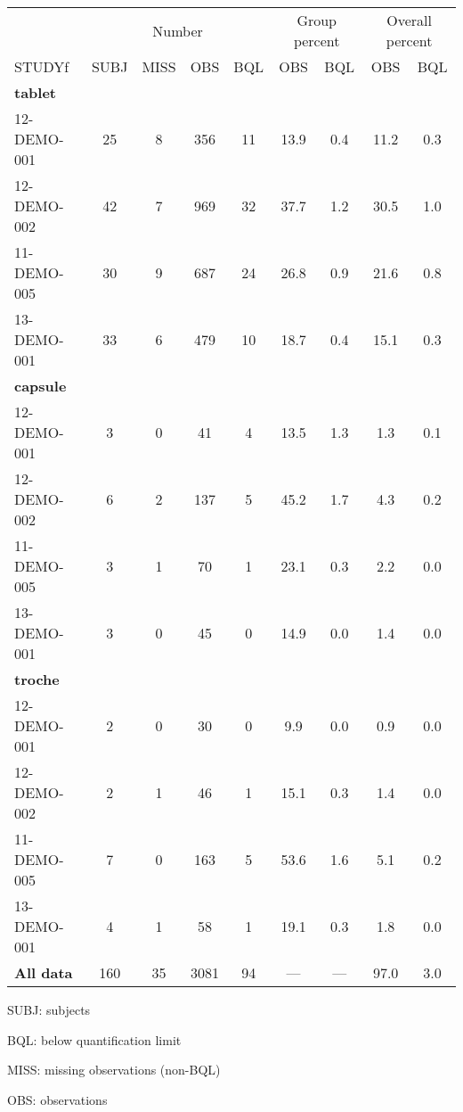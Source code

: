\setlength{\tabcolsep}{5pt} 
\begin{threeparttable}
\renewcommand{\arraystretch}{1.3}
\begin{tabular}[h]{lcccccccc}
\hline
\multicolumn{1}{c}{} & \multicolumn{4}{c}{Number} & \multicolumn{2}{c}{Group percent} & \multicolumn{2}{c}{Overall percent} \\
\cmidrule(lr){2-5}
\cmidrule(lr){6-7}
\cmidrule(lr){8-9}
STUDYf & SUBJ & MISS & OBS & BQL & OBS & BQL & OBS & BQL \\
\hline
\multicolumn{9}{l}{\textbf{tablet}}\\%
12-DEMO-001 & 25 & 8 & 356 & 11 & 13.9 & 0.4 & 11.2 & 0.3 \\
12-DEMO-002 & 42 & 7 & 969 & 32 & 37.7 & 1.2 & 30.5 & 1.0 \\
11-DEMO-005 & 30 & 9 & 687 & 24 & 26.8 & 0.9 & 21.6 & 0.8 \\
13-DEMO-001 & 33 & 6 & 479 & 10 & 18.7 & 0.4 & 15.1 & 0.3 \\
\hline \multicolumn{9}{l}{\textbf{capsule}}\\%
12-DEMO-001 & 3 & 0 & 41 & 4 & 13.5 & 1.3 & 1.3 & 0.1 \\
12-DEMO-002 & 6 & 2 & 137 & 5 & 45.2 & 1.7 & 4.3 & 0.2 \\
11-DEMO-005 & 3 & 1 & 70 & 1 & 23.1 & 0.3 & 2.2 & 0.0 \\
13-DEMO-001 & 3 & 0 & 45 & 0 & 14.9 & 0.0 & 1.4 & 0.0 \\
\hline \multicolumn{9}{l}{\textbf{troche}}\\%
12-DEMO-001 & 2 & 0 & 30 & 0 & 9.9 & 0.0 & 0.9 & 0.0 \\
12-DEMO-002 & 2 & 1 & 46 & 1 & 15.1 & 0.3 & 1.4 & 0.0 \\
11-DEMO-005 & 7 & 0 & 163 & 5 & 53.6 & 1.6 & 5.1 & 0.2 \\
13-DEMO-001 & 4 & 1 & 58 & 1 & 19.1 & 0.3 & 1.8 & 0.0 \\
\hline \hline {\bf All data} & 160 & 35 & 3081 & 94 & --- & --- & 97.0 & 3.0 \\
\hline
\end{tabular}
\begin{tablenotes}[flushleft]
\item SUBJ: subjects
\item BQL: below quantification limit
\item MISS: missing observations (non-BQL)
\item OBS: observations
\end{tablenotes}
\end{threeparttable}

